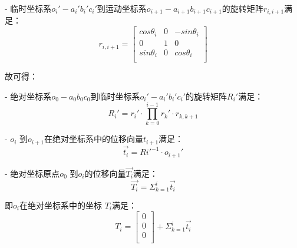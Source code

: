 - 临时坐标系$o_i'-a_i'b_i'c_i'$到运动坐标系$o_{i+1}-a_{i+1}b_{i+1}c_{i+1}$的旋转矩阵$r_{i, i+1}$满足：
    \begin{equation}
    r_{i, i+1} = \left[
      \begin{matrix}
      cos \theta_i & 0 & -sin \theta_i\\
      0 &1 & 0\\
      sin \theta_i & 0 & cos \theta_i\\
      \end{matrix}
    \right]
    \end{equation}

故可得：

- 绝对坐标系$o_0-a_0b_0c_0$到临时坐标系$o_i'-a_i'b_i'c_i'$的旋转矩阵$R_i'$满足：
    \begin{equation}
    R_i' = r_i' \cdot \prod_{k = 0}^{i-1} r_k' \cdot r_{k, k+1}
    \end{equation}
    
- $o_i$ 到$o_{i+1}$在绝对坐标系中的位移向量$t_{i+1}$满足：
    \begin{equation}
    \vec{t_i} = Ri'^{-1}\cdot o_{i+1}'
    \end{equation}

- 绝对坐标原点$o_0$ 到$o_i$的位移向量$\vec{T_i}$满足：
    \begin{equation}
    \vec{T_i} = \Sigma_{k=1} ^ {i} \vec{t_i}
    \end{equation}

即$o_i$在绝对坐标系中的坐标 $T_i$满足：
\begin{equation}
T_i = \left[
    \begin{matrix}
    0\\
    0\\
    0\\
  	\end{matrix}
  \right]
  + \Sigma_{k=1} ^ {i} \vec{t_i}
\end{equation}


